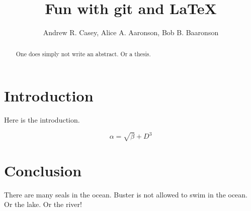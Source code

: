 \documentclass{article}
\begin{document}
\title{Fun with git and \LaTeX{}}
\author{Andrew R. Casey, Alice A. Aaronson, Bob B. Baaronson}

\maketitle

\begin{abstract}
One does simply not write an abstract. Or a thesis.
\end{abstract}

\section{Introduction}
Here is the introduction.

\begin{equation}
    \label{simple_equation}
    \alpha = \sqrt{ \beta } + D^3
\end{equation}


\section{Conclusion}
There are many seals in the ocean. Buster is not allowed to swim in the ocean. Or the lake. Or the river!
\end{document}
